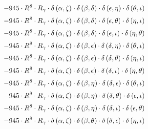 \begin{subequations}
\begin{gather}
 \\[0.2em] \notag 		 - 945 \cdot R^{8} \cdot R_{\gamma{}} \cdot \delta{}\left(\alpha{}, \zeta{}\right) \cdot \delta{}\left(\beta{}, \delta{}\right) \cdot \delta{}\left(\epsilon{}, \eta{}\right) \cdot \delta{}\left(\theta{}, \iota{}\right) 
 \\[0.2em] \notag 		 - 945 \cdot R^{8} \cdot R_{\gamma{}} \cdot \delta{}\left(\alpha{}, \zeta{}\right) \cdot \delta{}\left(\beta{}, \delta{}\right) \cdot \delta{}\left(\epsilon{}, \theta{}\right) \cdot \delta{}\left(\eta{}, \iota{}\right) 
 \\[0.2em] \notag 		 - 945 \cdot R^{8} \cdot R_{\gamma{}} \cdot \delta{}\left(\alpha{}, \zeta{}\right) \cdot \delta{}\left(\beta{}, \delta{}\right) \cdot \delta{}\left(\epsilon{}, \iota{}\right) \cdot \delta{}\left(\eta{}, \theta{}\right) 
 \\[0.2em] \notag 		 - 945 \cdot R^{8} \cdot R_{\gamma{}} \cdot \delta{}\left(\alpha{}, \zeta{}\right) \cdot \delta{}\left(\beta{}, \epsilon{}\right) \cdot \delta{}\left(\delta{}, \eta{}\right) \cdot \delta{}\left(\theta{}, \iota{}\right) 
 \\[0.2em] \notag 		 - 945 \cdot R^{8} \cdot R_{\gamma{}} \cdot \delta{}\left(\alpha{}, \zeta{}\right) \cdot \delta{}\left(\beta{}, \epsilon{}\right) \cdot \delta{}\left(\delta{}, \theta{}\right) \cdot \delta{}\left(\eta{}, \iota{}\right) 
 \\[0.2em] \notag 		 - 945 \cdot R^{8} \cdot R_{\gamma{}} \cdot \delta{}\left(\alpha{}, \zeta{}\right) \cdot \delta{}\left(\beta{}, \epsilon{}\right) \cdot \delta{}\left(\delta{}, \iota{}\right) \cdot \delta{}\left(\eta{}, \theta{}\right) 
 \\[0.2em] \notag 		 - 945 \cdot R^{8} \cdot R_{\gamma{}} \cdot \delta{}\left(\alpha{}, \zeta{}\right) \cdot \delta{}\left(\beta{}, \eta{}\right) \cdot \delta{}\left(\delta{}, \epsilon{}\right) \cdot \delta{}\left(\theta{}, \iota{}\right) 
 \\[0.2em] \notag 		 - 945 \cdot R^{8} \cdot R_{\gamma{}} \cdot \delta{}\left(\alpha{}, \zeta{}\right) \cdot \delta{}\left(\beta{}, \eta{}\right) \cdot \delta{}\left(\delta{}, \theta{}\right) \cdot \delta{}\left(\epsilon{}, \iota{}\right) 
 \\[0.2em] \notag 		 - 945 \cdot R^{8} \cdot R_{\gamma{}} \cdot \delta{}\left(\alpha{}, \zeta{}\right) \cdot \delta{}\left(\beta{}, \eta{}\right) \cdot \delta{}\left(\delta{}, \iota{}\right) \cdot \delta{}\left(\epsilon{}, \theta{}\right) 
 \\[0.2em] \notag 		 - 945 \cdot R^{8} \cdot R_{\gamma{}} \cdot \delta{}\left(\alpha{}, \zeta{}\right) \cdot \delta{}\left(\beta{}, \theta{}\right) \cdot \delta{}\left(\delta{}, \epsilon{}\right) \cdot \delta{}\left(\eta{}, \iota{}\right) 

\end{gather}
\end{subequations}

